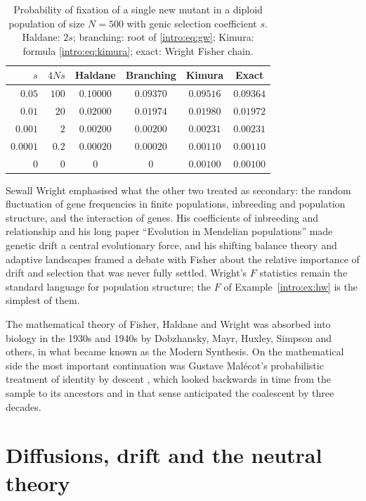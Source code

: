 \begin{table}[ht]
\centering
\small
\caption{Probability of fixation of a single new mutant in a diploid population of size $N=500$
with genic selection coefficient $s$. Haldane: $2s$; branching: root of \eqref{intro:eq:gw};
Kimura: formula \eqref{intro:eq:kimura}; exact: Wright Fisher chain.}\label{intro:tab:fix}
\begin{tabular}{rrcccc}
\toprule
$s$ & $4Ns$ & Haldane & Branching & Kimura & Exact \\
\midrule
$0.05$   & $100$ & $0.10000$ & $0.09370$ & $0.09516$ & $0.09364$ \\
$0.01$   & $20$  & $0.02000$ & $0.01974$ & $0.01980$ & $0.01972$ \\
$0.001$  & $2$   & $0.00200$ & $0.00200$ & $0.00231$ & $0.00231$ \\
$0.0001$ & $0.2$ & $0.00020$ & $0.00020$ & $0.00110$ & $0.00110$ \\
$0$      & $0$   & $0$       & $0$       & $0.00100$ & $0.00100$ \\
\bottomrule
\end{tabular}
\end{table}

Sewall Wright emphasised what the other two treated as secondary: the random fluctuation of gene
frequencies in finite populations, inbreeding and population structure, and the interaction of
genes. His coefficients of inbreeding and relationship \citep{intro:wright1922} and his long paper
``Evolution in Mendelian populations'' \citep{intro:wright1931} made genetic drift a central
evolutionary force, and his shifting balance theory and adaptive landscapes framed a debate with
Fisher about the relative importance of drift and selection that was never fully settled. Wright's
$F$ statistics \citep{intro:wright1951} remain the standard language for population structure; the
$F$ of Example~\ref{intro:ex:hw} is the simplest of them.

The mathematical theory of Fisher, Haldane and Wright was absorbed into biology in the 1930s and
1940s by Dobzhansky, Mayr, Huxley, Simpson and others, in what became known as the Modern Synthesis.
On the mathematical side the most important continuation was Gustave Mal\'ecot's probabilistic
treatment of identity by descent \citep{intro:malecot1948}, which looked backwards in time from
the sample to its ancestors and in that sense anticipated the coalescent by three decades.

\section{Diffusions, drift and the neutral theory}

